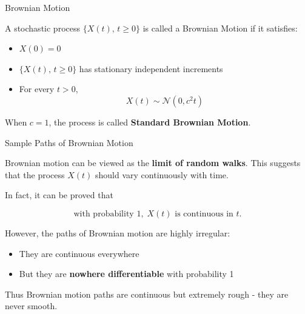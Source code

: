 \documentclass{beamer}
\begin{document}
\begin{frame}{Brownian Motion}

A stochastic process $\{X(t),\, t \ge 0\}$ is called a 
Brownian Motion if it satisfies:

\begin{itemize}[<+->]
\item $X(0) = 0$
\item $\{X(t),\, t \ge 0\}$ has stationary independent increments
\item For every $t > 0$, 
\[
X(t) \sim \mathcal{N}(0, c^{2}t)
\]
\end{itemize}

\pause

When $c=1$, the process is called \textbf{Standard Brownian Motion}.

\end{frame}

\begin{frame}{Sample Paths of Brownian Motion}

Brownian motion can be viewed as the \textbf{limit of random walks}.
This suggests that the process $X(t)$ should vary continuously with time.

\pause

In fact, it can be proved that

\[
\text{with probability }1,\; X(t)\text{ is continuous in }t.
\]

\pause

However, the paths of Brownian motion are highly irregular:

\begin{itemize}
\item They are continuous everywhere
\item But they are \textbf{nowhere differentiable} with probability 1
\end{itemize}

\pause

Thus Brownian motion paths are continuous but extremely rough
- they are never smooth.

\end{frame}
\end{document}
